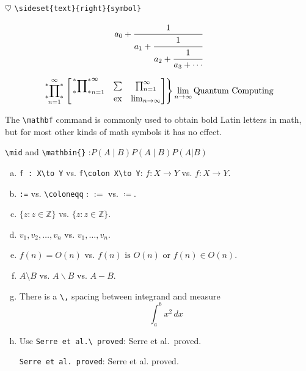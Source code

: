 \documentclass[12pt]{amsart}
\theoremstyle{plain}
\theoremstyle{definition}
\theoremstyle{remark}
\numberwithin{equation}{section} %
\newcommand{\bbZ}{\mathbb{Z}}
\DeclareMathOperator{\ex}{ex}
\begin{document}
$\heartsuit$ \verb|\sideset{text}{right}{symbol}|

\[
	a_0+\cfrac{1}{a_1+\cfrac{1}{a_2+\cfrac{1}{a_3+\cdots}}}
\]

\begin{equation}
	\sideset{_\ast^\ast}{_\ast^\ast}\prod_{n=1}^{\infty} \left.	\begin{aligned}
		\begin{bmatrix}
			\sideset{_\ast^\ast}{_\ast^\ast}\prod_{n=1}^{\infty} & \sum & \prod_{n=1}^{\infty} \\
			                                                     & \ex  & \lim_{n\to \infty}
		\end{bmatrix}
	\end{aligned} \right \rbrace \lim_{n\to \infty} \text{Quantum Computing}
\end{equation}

The \verb|\mathbf| command is commonly used to obtain bold Latin letters in math, but for most other kinds of math symbols it has no effect.

\verb|\mid| and \verb|\mathbin{}|	:$ P(A \mid B) P(A \mathbin{\vert} B )  P(A | B)  $
\begin{enumerate}[(a)]
	\item \verb|f : X\to Y| vs. \verb|f\colon X\to Y|: $ f : X\to Y $ vs. $ f\colon X\to Y $.

	\item \verb|:=| vs. \verb|\coloneqq| : $ :=  $ vs. $ \coloneqq $.

	\item $ \lbrace z : z \in \bbZ \rbrace $ vs. $ \lbrace z \colon z \in \bbZ \rbrace $.

	\item $ v_{1}, v_{2}, \dotsc,v_{n} $ vs. $ v_{1},\dotsc,v_{n} $.

	\item $ f(n) = O(n) $ vs. $ f(n) \text{ is } O(n)$ or $ f(n)\in O(n) $.

	\item $ A\setminus B $ vs. $ A\backslash B $ vs. $ A-B $.

	\item There is a \verb|\,| spacing between integrand and measure
	      \[ \int_{a}^{b} x^2 \,dx \]
	      
	\item Use \verb|Serre et al.\ proved|: Serre et al.\ proved.
	
	\verb|Serre et al. proved|: Serre et al. proved.
	
\end{enumerate}
\end{document}
